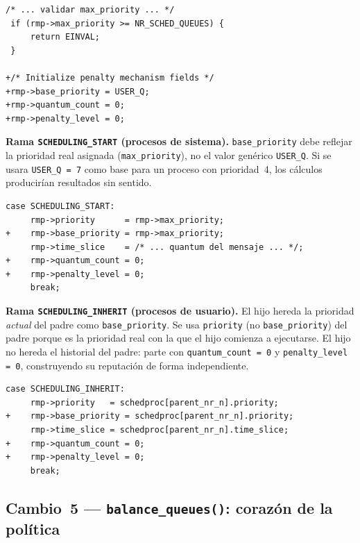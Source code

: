\documentclass[11pt,a4paper]{article}
\begin{document}
\begin{lstlisting}[style=diffstyle,caption={Inicializaci\'on temprana en \texttt{do\_start\_scheduling()}}]
 /* ... validar max_priority ... */
 if (rmp->max_priority >= NR_SCHED_QUEUES) {
     return EINVAL;
 }

+/* Initialize penalty mechanism fields */
+rmp->base_priority = USER_Q;
+rmp->quantum_count = 0;
+rmp->penalty_level = 0;
\end{lstlisting}

\medskip
\noindent\textbf{Rama \texttt{SCHEDULING\_START} (procesos de sistema).}
\texttt{base\_priority} debe reflejar la prioridad real asignada
(\texttt{max\_priority}), no el valor gen\'erico \texttt{USER\_Q}. Si se usara
\texttt{USER\_Q = 7} como base para un proceso con prioridad~4, los c\'alculos
producir\'ian resultados sin sentido.

\begin{lstlisting}[style=diffstyle,caption={Rama \texttt{SCHEDULING\_START}}]
 case SCHEDULING_START:
     rmp->priority      = rmp->max_priority;
+    rmp->base_priority = rmp->max_priority;
     rmp->time_slice    = /* ... quantum del mensaje ... */;
+    rmp->quantum_count = 0;
+    rmp->penalty_level = 0;
     break;
\end{lstlisting}

\medskip
\noindent\textbf{Rama \texttt{SCHEDULING\_INHERIT} (procesos de usuario).}
El hijo hereda la prioridad \emph{actual} del padre como \texttt{base\_priority}. Se
usa \texttt{priority} (no \texttt{base\_priority}) del padre porque es la prioridad
real con la que el hijo comienza a ejecutarse. El hijo no hereda el historial del padre:
parte con \texttt{quantum\_count = 0} y \texttt{penalty\_level = 0}, construyendo su
reputaci\'on de forma independiente.

\begin{lstlisting}[style=diffstyle,caption={Rama \texttt{SCHEDULING\_INHERIT}}]
 case SCHEDULING_INHERIT:
     rmp->priority   = schedproc[parent_nr_n].priority;
+    rmp->base_priority = schedproc[parent_nr_n].priority;
     rmp->time_slice = schedproc[parent_nr_n].time_slice;
+    rmp->quantum_count = 0;
+    rmp->penalty_level = 0;
     break;
\end{lstlisting}

\subsection{Cambio~5 --- \texttt{balance\_queues()}: coraz\'on de la pol\'itica}
\end{document}

